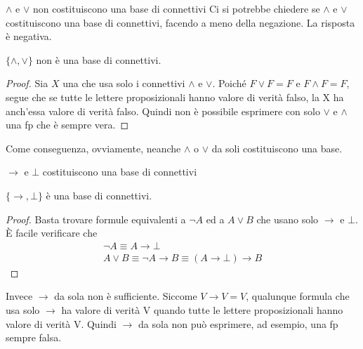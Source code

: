 \documentclass[aspectratio=169,10pt,dvipsnames,xcolor=table,handout]{beamer}
\begin{document}
\begin{frame}{$\wedge$ e $\vee$ non costituiscono una base di connettivi}
    Ci si potrebbe chiedere se $\wedge$ e $\vee$ costituiscono una base di connettivi, facendo a meno della negazione. La risposta è negativa.

    \begin{theorem}
        $\{ \wedge, \vee\}$ non è una base di connettivi.
    \end{theorem}
    \begin{proof}
        Sia $X$ una \fp che usa solo i connettivi $\wedge$ e $\vee$. Poiché $F \vee F = F$ e $F \wedge F= F$, segue che se tutte le lettere proposizionali hanno valore di verità falso, la \fp X ha anch'essa valore di verità falso. Quindi non è possibile esprimere con solo $\vee$ e $\wedge$ una fp che è sempre vera.
    \end{proof}

    Come conseguenza, ovviamente, neanche $\wedge$  o $\vee$ da soli costituiscono una base.
\end{frame}

\begin{frame}{$\to$ e $\bot$ costituiscono una base di connettivi}
    \begin{theorem}
        $\{ \to, \bot\}$ è una base di connettivi.
    \end{theorem}
    \begin{proof}
    Basta trovare formule equivalenti a $\neg A$ ed a $A \vee B$ che usano solo $\to$ e $\bot$. È facile verificare che
    \begin{gather*}
        \neg A \equiv A \to \bot\\
        A \vee B \equiv \neg A \to B \equiv (A \to \bot) \to B
    \end{gather*}
    \end{proof}

    Invece $\to$ da sola non è sufficiente. Siccome $V \to V = V$, qualunque formula che usa solo $\to$ ha valore di verità V quando tutte le lettere proposizionali hanno valore di verità V. Quindi $\to$ da sola non può esprimere, ad esempio, una fp sempre falsa.
\end{frame}
\end{document}
